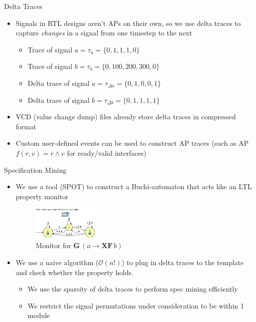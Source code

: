 \documentclass[12pt,aspectratio=169]{beamer}
\begin{document}
\begin{frame}{Delta Traces}
  \begin{itemize}
    \setlength\itemsep{0.75em}
    \item Signals in RTL designs aren't APs on their own, so we use delta traces to capture \textit{changes} in a signal from one timestep to the next
    \begin{itemize}
      \item Trace of signal $a = \tau_a = \{0, 1, 1, 1, 0\}$
      \item Trace of signal $b = \tau_b = \{0, 100, 200, 300, 0\}$
      \item Delta trace of signal $a = \tau_{\Delta a} = \{0, 1, 0, 0, 1\}$
      \item Delta trace of signal $b = \tau_{\Delta b} = \{0, 1, 1, 1, 1\}$
    \end{itemize}
    \item VCD (value change dump) files already store delta traces in compressed format
    \item Custom user-defined events can be used to construct AP traces (such as AP $f(r,v) = r \land v$ for ready/valid interfaces)
  \end{itemize}
\end{frame}

\begin{frame}{Specification Mining}
  \begin{itemize}
    \setlength\itemsep{0.75em}
    \item We use a tool (SPOT) to construct a Buchi-automaton that acts like an LTL property monitor
    \begin{figure}
      \centering
      \includegraphics[width=0.3\textwidth]{spot.png}
      \caption{Monitor for $\mathbf{G}\, (a \rightarrow \mathbf{XF}\, b)$}
    \end{figure}
  \item We use a naive algorithm ($\mathcal{O}(n!)$) to plug in delta traces to the template and check whether the property holds.
      \begin{itemize}
        \setlength\itemsep{0.5em}
        \item We use the sparsity of delta traces to perform spec mining efficiently
        \item We restrict the signal permutations under consideration to be within 1 module
      \end{itemize}
  \end{itemize}
\end{frame}
\end{document}
